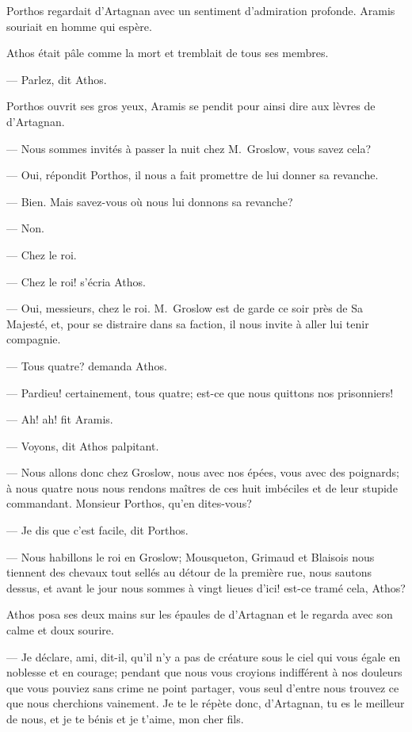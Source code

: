 Porthos regardait d'Artagnan avec un sentiment d'admiration profonde. Aramis souriait en homme qui espère.

Athos était pâle comme la mort et tremblait de tous ses membres.

— Parlez, dit Athos.

Porthos ouvrit ses gros yeux, Aramis se pendit pour ainsi dire aux lèvres de d'Artagnan.

— Nous sommes invités à passer la nuit chez M.~Groslow, vous savez cela?

— Oui, répondit Porthos, il nous a fait promettre de lui donner sa revanche.

— Bien. Mais savez-vous où nous lui donnons sa revanche?

— Non.

— Chez le roi.

— Chez le roi! s'écria Athos.

— Oui, messieurs, chez le roi. M.~Groslow est de garde ce soir près de Sa Majesté, et, pour se distraire dans sa faction, il nous invite à aller lui tenir compagnie.

— Tous quatre? demanda Athos.

— Pardieu! certainement, tous quatre; est-ce que nous quittons nos prisonniers!

— Ah! ah! fit Aramis.

— Voyons, dit Athos palpitant.

— Nous allons donc chez Groslow, nous avec nos épées, vous avec des poignards; à nous quatre nous nous rendons maîtres de ces huit imbéciles et de leur stupide commandant. Monsieur Porthos, qu'en dites-vous?

— Je dis que c'est facile, dit Porthos.

— Nous habillons le roi en Groslow; Mousqueton, Grimaud et Blaisois nous tiennent des chevaux tout sellés au détour de la première rue, nous sautons dessus, et avant le jour nous sommes à vingt lieues d'ici! est-ce tramé cela, Athos?

Athos posa ses deux mains sur les épaules de d'Artagnan et le regarda avec son calme et doux sourire.

— Je déclare, ami, dit-il, qu'il n'y a pas de créature sous le ciel qui vous égale en noblesse et en courage; pendant que nous vous croyions indifférent à nos douleurs que vous pouviez sans crime ne point partager, vous seul d'entre nous trouvez ce que nous cherchions vainement. Je te le répète donc, d'Artagnan, tu es le meilleur de nous, et je te bénis et je t'aime, mon cher fils.

